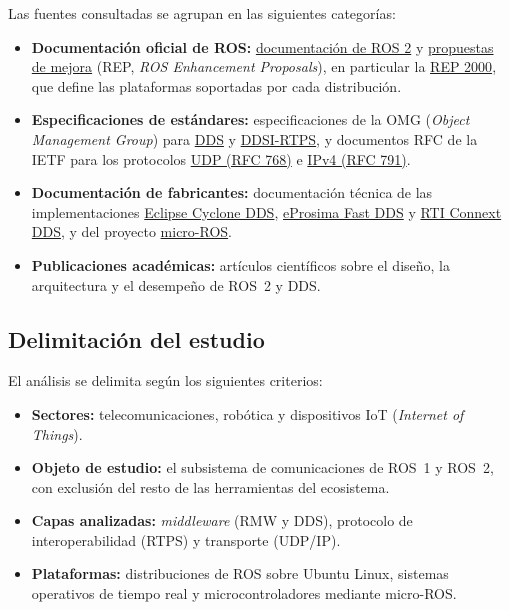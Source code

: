 Las fuentes consultadas se agrupan en las siguientes categorías:
\begin{itemize}
    \item \textbf{Documentación oficial de ROS:}
    \href{https://docs.ros.org}{documentación de ROS 2} y
    \href{https://www.ros.org/reps/rep-0000.html}{propuestas de mejora} (REP,
    \textit{ROS Enhancement Proposals}), en particular la
    \href{https://www.ros.org/reps/rep-2000.html}{REP 2000}, que define las
    plataformas soportadas por cada distribución.
    \item \textbf{Especificaciones de estándares:} especificaciones de la OMG
    (\textit{Object Management Group}) para
    \href{https://www.omg.org/spec/DDS/}{DDS} y
    \href{https://www.omg.org/spec/DDSI-RTPS/}{DDSI-RTPS}, y documentos RFC de
    la IETF para los protocolos
    \href{https://www.rfc-editor.org/rfc/rfc768}{UDP (RFC 768)} e
    \href{https://www.rfc-editor.org/rfc/rfc791}{IPv4 (RFC 791)}.
    \item \textbf{Documentación de fabricantes:} documentación técnica de las
    implementaciones \href{https://cyclonedds.io}{Eclipse Cyclone DDS},
    \href{https://fast-dds.docs.eprosima.com}{eProsima Fast DDS} y
    \href{https://community.rti.com/documentation}{RTI Connext DDS}, y del
    proyecto \href{https://micro.vulcanexus.org/}{micro-ROS}.
    \item \textbf{Publicaciones académicas:} artículos científicos sobre el
    diseño, la arquitectura y el desempeño de ROS~2 y DDS.
\end{itemize}

\subsection{Delimitación del estudio}
El análisis se delimita según los siguientes criterios:
\begin{itemize}
    \item \textbf{Sectores:} telecomunicaciones, robótica y dispositivos IoT
    (\textit{Internet of Things}).
    \item \textbf{Objeto de estudio:} el subsistema de comunicaciones de ROS~1
    y ROS~2, con exclusión del resto de las herramientas del ecosistema.
    \item \textbf{Capas analizadas:} \textit{middleware} (RMW y DDS), protocolo
    de interoperabilidad (RTPS) y transporte (UDP/IP).
    \item \textbf{Plataformas:} distribuciones de ROS sobre Ubuntu Linux,
    sistemas operativos de tiempo real y microcontroladores mediante
    micro-ROS.
\end{itemize}

